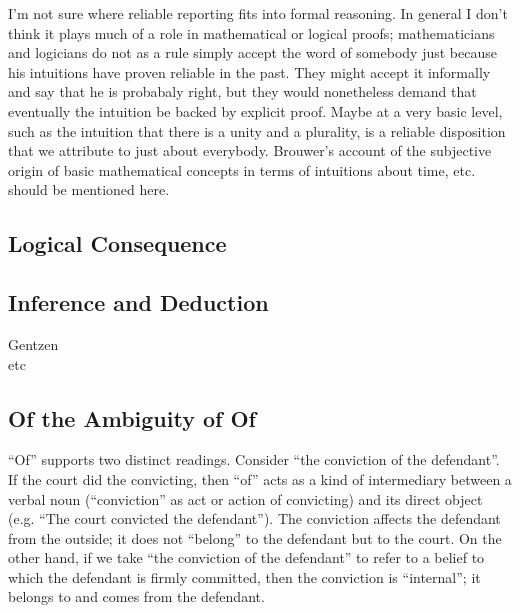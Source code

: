 \begin{ednote}
  I'm not sure where reliable reporting fits into formal reasoning.
  In general I don't think it plays much of a role in mathematical or
  logical proofs; mathematicians and logicians do not as a rule simply
  accept the word of somebody just because his intuitions have proven
  reliable in the past.  They might accept it informally and say that
  he is probabaly right, but they would nonetheless demand that
  eventually the intuition be backed by explicit proof.  Maybe at a
  very basic level, such as the intuition that there is a unity and a
  plurality, is a reliable disposition that we attribute to just about
  everybody.  Brouwer's account of the subjective origin of basic
  mathematical concepts in terms of intuitions about time, etc. should
  be mentioned here.
\end{ednote}

\subsection{Logical Consequence}
\label{subs:logconseq}

\cite{prawitz_logical_2005}

\cite{prawitz_meaning_2006}

\cite{prawitz_inference_2009}

\cite{prawitz_epistemic_2011}

\cite{prawitz_truth_epistemic}

\subsection{Inference and Deduction}
\label{sect:infdeduc}

\begin{description}
\item [Gentzen]
\item [etc]
\end{description}

\subsection{Of the Ambiguity of Of}
\label{subs:ofofof}

``Of'' supports two distinct readings.  Consider ``the conviction of
the defendant''.  If the court did the convicting, then ``of'' acts as
a kind of intermediary between a verbal noun (``conviction'' as act or
action of convicting) and its direct object (e.g. ``The court
convicted the defendant'').  The conviction affects the defendant from
the outside; it does not ``belong'' to the defendant but to the court.
On the other hand, if we take ``the conviction of the defendant'' to
refer to a belief to which the defendant is firmly committed, then the
conviction is ``internal''; it belongs to and comes from the
defendant.

